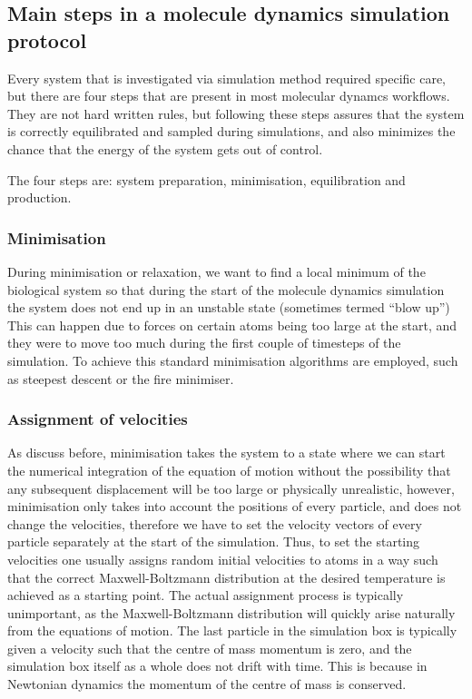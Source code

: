 \subsection{Main steps in a molecule dynamics simulation protocol}

Every system that is investigated via simulation method required specific care, but there are four steps that are present in most molecular dynamcs workflows. They are not hard written rules, but following these steps assures that the system is correctly equilibrated and sampled during simulations, and also minimizes the chance that the energy of the system gets out of control.

The four steps are: system preparation, minimisation, equilibration and production.

\subsubsection{Minimisation}

During minimisation or relaxation, we want to find a local minimum of the biological system so that during the start of the molecule dynamics simulation the system does not end up in an unstable state (sometimes termed ``blow up'') This can happen due to forces on certain atoms being too large at the start, and they were to move too much during the first couple of timesteps of the simulation. To achieve this standard minimisation algorithms are employed, such as steepest descent or the fire minimiser. 

\subsubsection{Assignment of velocities}

As discuss before, minimisation takes the system to a state where we can start the numerical integration of the equation of motion without the possibility that any subsequent displacement will be too large or physically unrealistic,  however, minimisation only takes into account the positions of every particle, and does not change the velocities, therefore we have to set the velocity vectors of every particle separately at the start of the simulation. Thus, to set the starting velocities one usually assigns random initial velocities to atoms in a way such that the correct Maxwell-Boltzmann distribution at the desired temperature is achieved as a starting point. The actual assignment process is typically unimportant, as the Maxwell-Boltzmann distribution will quickly arise naturally from the equations of motion. The last particle in the simulation box is typically given a velocity such that the centre of mass momentum is zero, and the simulation box itself as a whole does not drift with time. This is because in Newtonian dynamics the momentum of the centre of mass is conserved. 

